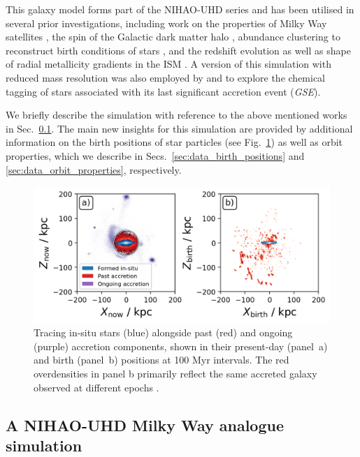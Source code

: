 \documentclass[fleqn,usenatbib]{mnras}
\begin{document}
This galaxy model forms part of the NIHAO-UHD series \citep{Buck2020b} and has been utilised in several prior investigations, including work on the properties of Milky Way satellites \citep{Buck2019b}, the spin of the Galactic dark matter halo \citep{Obreja2022}, abundance clustering to reconstruct birth conditions of stars \citep{Ratcliffe2022}, and the redshift evolution as well as shape of radial metallicity gradients in the ISM \citep{Ratcliffe2025, Buder2025}. A version of this simulation with reduced mass resolution was also employed by \citet{Buck2023} and \citet{Buder2024} to explore the chemical tagging of stars associated with its last significant accretion event (\textit{GSE}).

We briefly describe the simulation with reference to the above mentioned works in Sec.~\ref{sec:data_simulation}. The main new insights for this simulation are provided by additional information on the birth positions of star particles (see Fig.~\ref{fig:tracing_insitu_accretion_2}) as well as orbit properties, which we describe in Secs.~\ref{sec:data_birth_positions} and \ref{sec:data_orbit_properties}, respectively.

\begin{figure}
    \centering
    \includegraphics[width=\columnwidth]{figures/tracing_insitu_accretion_2.png}
    \caption{Tracing in-situ stars (blue) alongside past (red) and ongoing (purple) accretion components, shown in their present-day (panel~a) and birth (panel~b) positions at 100 Myr intervals. The red overdensities in panel b primarily reflect the same accreted galaxy observed at different epochs \href{https://github.com/svenbuder/gse_nihaouhd/tree/main/figures}{\faGithub}.}
    \label{fig:tracing_insitu_accretion_2}
\end{figure}

\subsection{A NIHAO-UHD Milky Way analogue simulation} \label{sec:data_simulation}
\end{document}
